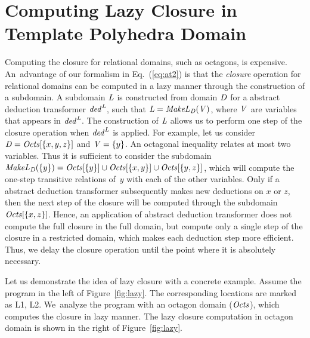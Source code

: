 \section{Computing Lazy Closure in Template Polyhedra Domain}\label{appendix:lazyclosure}
%
Computing the closure for relational domains, such as octagons, is
expensive.  An~advantage of our formalism in
Eq.~(\ref{eq:at2}) is that the \emph{closure} operation for relational
domains can be computed in a lazy manner through the construction of a
subdomain.  A subdomain $\mathit{L}$ is constructed from domain $\mathit{D}$
for a abstract deduction transformer $\mathit{ded}^{\mathit{L}}$, such that
$\mathit{L}=\mathit{MakeL}_{\mathit{D}}(\mathit{V})$, where $\mathit{V}$ are
variables that appears in $\mathit{ded}^{\mathit{L}}$.  The construction of
$\mathit{L}$ allows us to perform one step of the closure operation when
$\mathit{ded}^{\mathit{L}}$ is applied.
%
For example, let us consider $\mathit{D}=\mathit{Octs}[\{x,y,z\}]$ and
$\mathit{V}=\{y\}$. An octagonal inequality relates at 
most two variables. Thus it is sufficient to consider the subdomain
$\mathit{MakeL}_{\mathit{D}}(\{y\})=\mathit{Octs}[\{y\}]\cup\mathit{Octs}[\{x,y\}]\cup\mathit{Octs}[\{y,z\}]$,
which will compute the one-step transitive relations of~$y$ with each
of the other variables. 
%
Only if a abstract deduction transformer subsequently makes new deductions 
on $x$ or $z$, then the next step of the closure will be computed through 
the subdomain $\mathit{Octs}[\{x,z\}]$.
Hence, an application of abstract deduction transformer does not 
compute the full closure in the full domain, but compute only a 
single step of the closure in a restricted domain, which makes each 
deduction step more efficient.  Thus, we delay the closure operation 
until the point where it is absolutely necessary.  
%

Let us demonstrate the idea of lazy closure with a concrete example.  Assume
the program in the left of Figure~\ref{fig:lazy}.  The corresponding
locations are marked as L1, L2.  We~analyze the program with an octagon
domain ($\mathit{Octs}$), which computes the closure in lazy manner.  The lazy
closure computation in octagon domain is shown in the right of
Figure~\ref{fig:lazy}.

